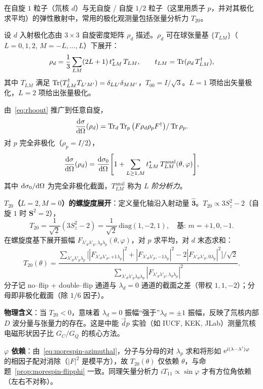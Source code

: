 \begin{example}
\label{ex:morespin-T20}
在自旋 $1$ 粒子（氘核 $d$）与无自旋 / 自旋 $1/2$ 粒子（这里用质子 $p$，并对其极化求平均）的弹性散射中，常用的极化观测量包括张量分析力 $T_{20}$。

设 $d$ 入射极化态由 $3\times 3$ 自旋密度矩阵 $\rho_d$ 描述。$\rho_d$ 可在球张量基 $\{T_{LM}\}$（$L=0,1,2$, $M=-L,\dots,L$）下展开：
\begin{equation}
\rho_d = \frac{1}{3}\sum_{LM} (2L+1)\,t^*_{LM}\,T_{LM},\qquad t_{LM}=\operatorname{Tr}(\rho_d\, T^\dagger_{LM}),
\label{eq:morespin-rho-d}
\end{equation}
其中 $T_{LM}$ 满足 $\operatorname{Tr}(T^\dagger_{LM}T_{L'M'})=\delta_{LL'}\delta_{MM'}$，$T_{00}=I/\sqrt{3}$。$L=1$ 项给出矢量极化，$L=2$ 项给出张量极化。

由~\eqref{eq:rhoout} 推广到任意自旋，
$$
\frac{\mathrm{d}\sigma}{\mathrm{d}\Omega}(\rho_d)=\operatorname{Tr}_{d}\operatorname{Tr}_{p}\big(F\rho_d\rho_p F^\dagger\big)/\operatorname{Tr}\rho_p.
$$
对 $p$ 完全非极化（$\rho_p=I/2$），
\begin{equation}
\frac{\mathrm{d}\sigma}{\mathrm{d}\Omega}(\rho_d)=\frac{\mathrm{d}\sigma_0}{\mathrm{d}\Omega}\Bigg[1+\sum_{L\geq 1, M}t^*_{LM}\,T_{LM}^{\text{anal}}(\theta,\varphi)\Bigg],
\label{eq:morespin-dsigma-tensor}
\end{equation}
其中 $\mathrm{d}\sigma_0/\mathrm{d}\Omega$ 为完全非极化截面，$T_{LM}^{\text{anal}}$ 称为 \emph{$L$ 阶分析力}。

\textbf{$T_{20}$（$L=2,M=0$）的螺旋度展开}：定义量化轴沿入射动量 $\hat{\bm 3}$。$T_{20}\propto 3S_z^2-2$（自旋 $1$ 时 $\bm S^2=2$），
$$
T_{20}=\frac{1}{\sqrt{2}}(3S_z^2-2)=\frac{1}{\sqrt{2}}\,\mathrm{diag}(1,-2,1),\quad\text{基: }m=+1,0,-1.
$$
在螺旋度基下展开振幅 $F_{\lambda'_d\lambda'_p,\lambda_d\lambda_p}(\theta,\varphi)$，对 $p$ 求平均，对 $d$ 末态求和：
\begin{equation}
T_{20}(\theta)=\frac{\sum_{\lambda'_d\lambda'_p\lambda_p}\Big[|F_{\lambda'_d\lambda'_p,+1\lambda_p}|^2+|F_{\lambda'_d\lambda'_p,-1\lambda_p}|^2-2|F_{\lambda'_d\lambda'_p,0\lambda_p}|^2\Big]/\sqrt{2}}{\sum_{\lambda'_d\lambda'_p\lambda_d\lambda_p}|F_{\lambda'_d\lambda'_p,\lambda_d\lambda_p}|^2}.
\label{eq:morespin-T20-helicity}
\end{equation}
分子记 no--flip + double--flip 通道与 $\lambda_d=0$ 通道的截面之差（带权 $1,1,-2$）；分母即非极化截面（除 $1/6$ 因子）。

\textbf{物理含义}：当 $T_{20}<0$，意味着 $\lambda_d=0$ 振幅“强于”$\lambda_d=\pm 1$ 振幅，反映了氘核内部 $D$ 波分量与张量力的存在。这是中能 $\vec d p$ 实验（如 IUCF, KEK, JLab）测量氘核电磁形状因子比 $G_C/G_Q$ 的核心方法。

\textbf{$\varphi$ 依赖}：由~\eqref{eq:morespin-azimuthal}，分子与分母的对 $\lambda_p$ 求和将形如 $\mathrm{e}^{\mathrm{i}(\lambda-\lambda')\varphi}$ 的相因子配对消除（$|F|^2$ 是模平方），故 $T_{20}(\theta)$ 仅依赖 $\theta$，与命题~\ref{prop:morespin-flipphi} 一致。同理矢量分析力 $iT_{11}\propto\sin\varphi$ 才有方位角依赖（左右不对称）。
\end{example}

